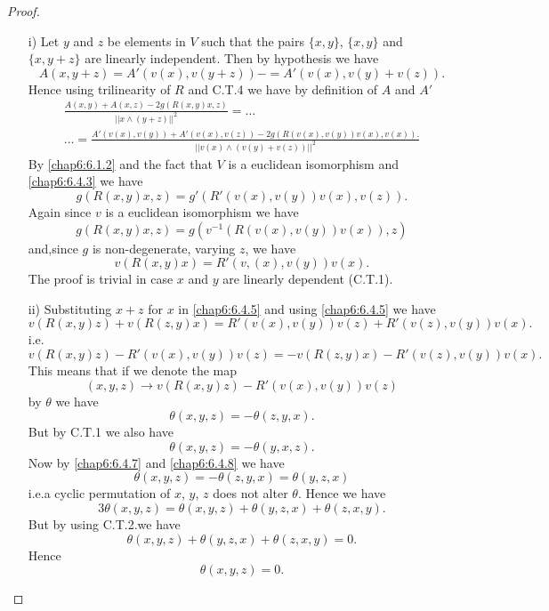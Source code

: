 \begin{proof}
\begin{itemize}
\item[i)] Let $y$ and $z$ be elements in $V$ such that the pairs
  $\{x,y\}$, $\{x,y\}$ and $\{x,y+z\}$ are linearly independent. Then
  by hypothesis we have
\begin{equation*}
A(x,y+z)=A'(v(x),v(y+z))-=A'(v(x),v(y)+v(z)).\tag{6.4.2}\label{chap6:6.4.2}
\end{equation*}
Hence using trilinearity of $R$ and C.T.4 we have by definition of $A$
and $A'$
\begin{gather*}
\frac{A(x,y)+A(x,z)-2g(R(x,y)x,z)}{||x\wedge(y+z)||^{2}}=\ldots\tag{6.4.3}\label{chap6:6.4.3}\\
\ldots=\frac{A'(v(x),v(y))+A'(v(x),v(z))-2g(R(v(x),v(y))v(x),v(x)).}{||v(x)\wedge
  (v(y)+v(z))||^{2}} 
\end{gather*}
By \eqref{chap6:6.1.2} and the fact that $V$ is a euclidean isomorphism and
\eqref{chap6:6.4.3} we have
\begin{equation*}
g(R(x,y)x,z)=g'(R'(v(x),v(y))v(x),v(z)).\tag{6.4.4}\label{chap6:6.4.4}
\end{equation*}
Again since $v$ is a euclidean isomorphism we have
$$
g(R(x,y)x,z)=g(v^{-1}(R(v(x),v(y))v(x)),z)
$$
and,\pageoriginale since $g$ is non-degenerate, varying $z$, we have
\begin{equation*}
v(R(x,y)x)=R'(v,(x),v(y))v(x).\tag{6.4.5}\label{chap6:6.4.5}
\end{equation*}
The proof is trivial in case $x$ and $y$ are linearly dependent
(C.T.1).

\item[ii)] Substituting $x+z$ for $x$ in \eqref{chap6:6.4.5} and using
  \eqref{chap6:6.4.5} we have
$$
v(R(x,y)z)+v(R(z,y)x)=R'(v(x),v(y))v(z)+R'(v(z),v(y))v(x).
$$
i.e.
\begin{equation*}
v(R(x,y)z)-R'(v(x),v(y))v(z)=-v(R(z,y)x)-R'(v(z),v(y))v(x).\tag{6.4.6}\label{chap6:6.4.6} 
\end{equation*}
This means that if we denote the map
$$
(x,y,z)\to v(R(x,y)z)-R'(v(x),v(y))v(z)
$$
by $\theta$ we have
\begin{equation*}
\theta (x,y,z)=-\theta(z,y,x).\tag{6.4.7}\label{chap6:6.4.7}
\end{equation*}
But by C.T.1 we also have
\begin{equation*}
\theta(x,y,z)=-\theta(y,x,z).\tag{6.4.8}\label{chap6:6.4.8}
\end{equation*}
Now by \eqref{chap6:6.4.7} and \eqref{chap6:6.4.8} we have
\begin{equation*}
\theta(x,y,z)=-\theta(z,y,x)=\theta(y,z,x)\tag{6.4.9}\label{chap6:6.4.9}
\end{equation*}
i.e.\@ a cyclic permutation of $x$, $y$, $z$ does not alter
$\theta$. Hence we have
$$
3\theta(x,y,z)=\theta(x,y,z)+\theta(y,z,x)+\theta(z,x,y).
$$
But by using C.T.2.\@ we have
$$
\theta(x,y,z)+\theta(y,z,x)+\theta(z,x,y)=0.
$$
Hence
$$
\theta(x,y,z)=0.
$$
\end{itemize}
\end{proof}

